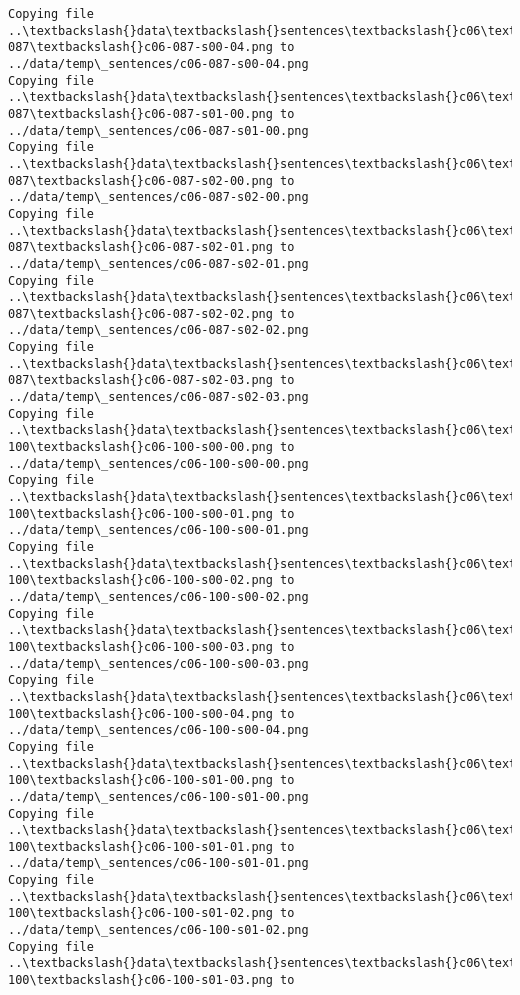 \documentclass[11pt]{article}
\begin{document}
\begin{Verbatim}[commandchars=\\\{\}]
Copying file ..\textbackslash{}data\textbackslash{}sentences\textbackslash{}c06\textbackslash{}c06-087\textbackslash{}c06-087-s00-04.png to
../data/temp\_sentences/c06-087-s00-04.png
Copying file ..\textbackslash{}data\textbackslash{}sentences\textbackslash{}c06\textbackslash{}c06-087\textbackslash{}c06-087-s01-00.png to
../data/temp\_sentences/c06-087-s01-00.png
Copying file ..\textbackslash{}data\textbackslash{}sentences\textbackslash{}c06\textbackslash{}c06-087\textbackslash{}c06-087-s02-00.png to
../data/temp\_sentences/c06-087-s02-00.png
Copying file ..\textbackslash{}data\textbackslash{}sentences\textbackslash{}c06\textbackslash{}c06-087\textbackslash{}c06-087-s02-01.png to
../data/temp\_sentences/c06-087-s02-01.png
Copying file ..\textbackslash{}data\textbackslash{}sentences\textbackslash{}c06\textbackslash{}c06-087\textbackslash{}c06-087-s02-02.png to
../data/temp\_sentences/c06-087-s02-02.png
Copying file ..\textbackslash{}data\textbackslash{}sentences\textbackslash{}c06\textbackslash{}c06-087\textbackslash{}c06-087-s02-03.png to
../data/temp\_sentences/c06-087-s02-03.png
Copying file ..\textbackslash{}data\textbackslash{}sentences\textbackslash{}c06\textbackslash{}c06-100\textbackslash{}c06-100-s00-00.png to
../data/temp\_sentences/c06-100-s00-00.png
Copying file ..\textbackslash{}data\textbackslash{}sentences\textbackslash{}c06\textbackslash{}c06-100\textbackslash{}c06-100-s00-01.png to
../data/temp\_sentences/c06-100-s00-01.png
Copying file ..\textbackslash{}data\textbackslash{}sentences\textbackslash{}c06\textbackslash{}c06-100\textbackslash{}c06-100-s00-02.png to
../data/temp\_sentences/c06-100-s00-02.png
Copying file ..\textbackslash{}data\textbackslash{}sentences\textbackslash{}c06\textbackslash{}c06-100\textbackslash{}c06-100-s00-03.png to
../data/temp\_sentences/c06-100-s00-03.png
Copying file ..\textbackslash{}data\textbackslash{}sentences\textbackslash{}c06\textbackslash{}c06-100\textbackslash{}c06-100-s00-04.png to
../data/temp\_sentences/c06-100-s00-04.png
Copying file ..\textbackslash{}data\textbackslash{}sentences\textbackslash{}c06\textbackslash{}c06-100\textbackslash{}c06-100-s01-00.png to
../data/temp\_sentences/c06-100-s01-00.png
Copying file ..\textbackslash{}data\textbackslash{}sentences\textbackslash{}c06\textbackslash{}c06-100\textbackslash{}c06-100-s01-01.png to
../data/temp\_sentences/c06-100-s01-01.png
Copying file ..\textbackslash{}data\textbackslash{}sentences\textbackslash{}c06\textbackslash{}c06-100\textbackslash{}c06-100-s01-02.png to
../data/temp\_sentences/c06-100-s01-02.png
Copying file ..\textbackslash{}data\textbackslash{}sentences\textbackslash{}c06\textbackslash{}c06-100\textbackslash{}c06-100-s01-03.png to

\end{Verbatim}
\end{document}
